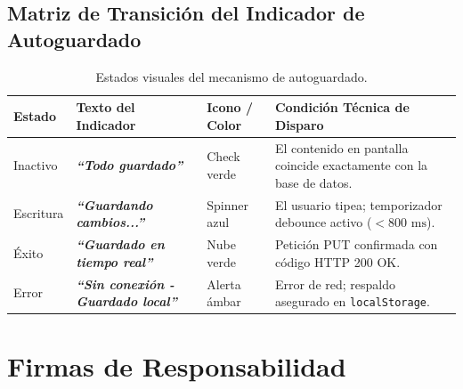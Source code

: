\documentclass[12pt,a4paper]{article}
\begin{document}
\subsection{Matriz de Transición del Indicador de Autoguardado}
\begin{table}[H]
\centering
\small
\renewcommand{\arraystretch}{1.2}
\begin{tabularx}{\textwidth}{|>{\hsize=0.4\hsize\centering\arraybackslash\footnotesize}X|>{\hsize=0.9\hsize\raggedright\arraybackslash\bfseries\footnotesize}X|>{\hsize=0.7\hsize\centering\arraybackslash\footnotesize}X|>{\hsize=2.0\hsize\raggedright\arraybackslash\footnotesize}X|}
\hline
\rowcolor{tableheader}
\textbf{Estado} & \textbf{Texto del Indicador} & \textbf{Icono / Color} & \textbf{Condición Técnica de Disparo} \\
\hline
Inactivo & \textit{``Todo guardado''} & Check verde & El contenido en pantalla coincide exactamente con la base de datos. \\
\hline
Escritura & \textit{``Guardando cambios...''} & Spinner azul & El usuario tipea; temporizador debounce activo ($<800\text{ ms}$). \\
\hline
Éxito & \textit{``Guardado en tiempo real''} & Nube verde & Petición PUT confirmada con código HTTP 200 OK. \\
\hline
Error & \textit{``Sin conexión - Guardado local''} & Alerta ámbar & Error de red; respaldo asegurado en \texttt{localStorage}. \\
\hline
\end{tabularx}
\caption{Estados visuales del mecanismo de autoguardado.}
\end{table}

\section{Firmas de Responsabilidad}
\end{document}
